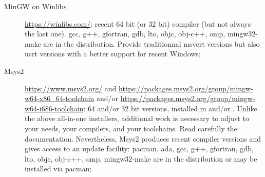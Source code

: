 \begin{description}
\item[MinGW on Winlibs] \url{https://winlibs.com/}: recent 64 bit (or 32 bit) compiler (but not always the last one). gcc, g++, gfortran, gdb, lto, objc, obj-c++, omp, mingw32-make are in the distribution. Provide traditionnal msvcrt versions but also ucrt versions with a better support for recent Windows;
\item[Msys2] \url{https://www.msys2.org/} and \url{https://packages.msys2.org/group/mingw-w64-x86_64-toolchain} and/or \url{https://packages.msys2.org/group/mingw-w64-i686-toolchain}: 64 and/or 32 bit versions, installed in  and/or . Unlike the above all-in-one installers, additional work is necessary to adjust to your needs, your compilers, and your toolchains. Read carefully the documentation. Nevertheless, Msys2 produces recent compiler versions and gives access to an update facility: pacman. ada, gcc, g++, gfortran, gdb, lto, objc, obj-c++, omp, mingw32-make are in the distribution or may be installed via pacman;
\end{description}

